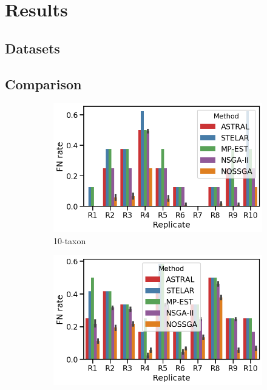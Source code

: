 \section{Results}
\subsection{Datasets}

\subsection{Comparison}
\begin{figure}[!htbp]
	\centering
	\begin{adjustwidth}{-4.2cm}{}
	\begin{subfigure}[b]{0.55\textwidth}
		\includegraphics[width=\textwidth]{Figure/10-taxon_10_replicates}
		\caption{10-taxon}
	\end{subfigure}%
	\begin{subfigure}[b]{0.55\textwidth}
		\includegraphics[width=\textwidth]{Figure/15-taxon_10_replicates}

\end{subfigure}
\end{adjustwidth}
\end{figure}
